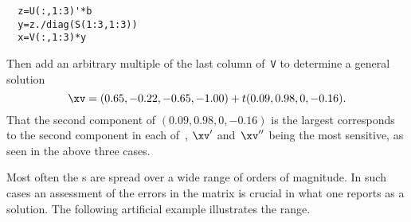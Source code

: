 \begin{reduce}
\begin{example}
\begin{solution}
\begin{verbatim}
  z=U(:,1:3)'*b
  y=z./diag(S(1:3,1:3))
  x=V(:,1:3)*y
\end{verbatim}
Then add an arbitrary multiple of the last column of~\verb|V| to determine a general solution~\twodp
\begin{equation*}
\xv=(0.65,-0.22,-0.65,-1.00)+t(0.09,0.98,0,-0.16).
\end{equation*}
That the second component of \((0.09,0.98,0,-0.16)\) is the largest corresponds to the second component in each of~\xv, \(\xv'\) and~\(\xv''\) being the most sensitive, as seen in the above three cases.
\end{solution}
\end{example}
\end{reduce}


Most often the s are spread over a wide range of orders of magnitude.
In such cases an assessment of the errors in the matrix is crucial in what one reports as a solution.
The following artificial example illustrates the range.

